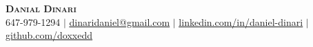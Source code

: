 \begin{center}
    \textbf{\Huge \scshape Danial Dinari} \\ \vspace{1pt}
    \small 647-979-1294 $|$ \href{mailto:dinaridaniel@gmail.com}{\underline{dinaridaniel@gmail.com}} $|$ 
    \href{https://www.linkedin.com/in/daniel-dinari/}{\underline{linkedin.com/in/daniel-dinari}} $|$
    \href{https://github.com/doxxedd}{\underline{github.com/doxxedd}}
\end{center}